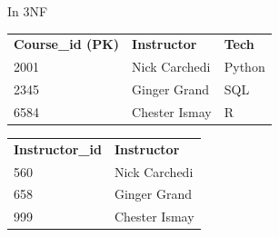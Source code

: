 In 3NF
\begin{table}[H]
    \begin{tabular}{lll}
        \textbf{Course\_id (PK)} & \textbf{Instructor} & \textbf{Tech} \\
        2001 & Nick Carchedi & Python \\
        2345 & Ginger Grand & SQL \\
        6584 & Chester Ismay & R
    \end{tabular}
\end{table}

\begin{table}[H]
    \begin{tabular}{ll}
        \textbf{Instructor\_id} & \textbf{Instructor} \\
        560 & Nick Carchedi \\
        658 & Ginger Grand \\
        999 & Chester Ismay
    \end{tabular}
\end{table}

